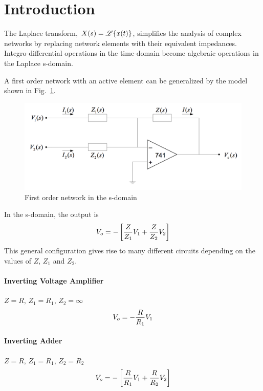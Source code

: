 \section{Introduction}\label{sec:intro}
The Laplace transform, $ X(s) = \mathscr{L} \lbrace x(t) \rbrace$, simplifies the analysis of complex networks by replacing network elements with their equivalent impedances.
Integro-differential operations in the time-domain become algebraic operations in the Laplace s-domain.

A first order network with an active element can be generalized by the model shown in Fig.~\ref{fig:first-order-network}.

\begin{figure}[htpb]
	\centering
	\includegraphics[width=0.7\linewidth]{graphics/s-network}	
	\caption{First order network in the s-domain}
	\label{fig:first-order-network}
\end{figure}

In the s-domain, the output is
\begin{equation}\label{eqn:first-order-network}
	V_o = - \left[ {Z \over Z_1}V_1 + {Z \over Z_2}V_2 \right]
\end{equation}
This general configuration gives rise to many different circuits depending on the values of $Z$, $Z_1$ and $Z_2$.

\paragraph{Inverting Voltage Amplifier} $Z = R$, $Z_1 = R_1$, $Z_2 = \infty$
\begin{equation}\label{eqn:inverter}
	V_o = - {R \over R_1}V_1
\end{equation}

\paragraph{Inverting Adder} $Z = R$, $Z_1 = R_1$, $Z_2 = R_2$
\begin{equation}\label{eqn:adder}
	V_o = - \left[ {R \over R_1}V_1 + {R \over R_2}V_2 \right]
\end{equation}

